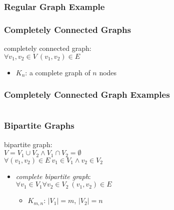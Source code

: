 \documentclass[dvipsnames]{beamer}
\begin{document}
\begin{frame}
  \frametitle{Regular Graph Example}

  \begin{example}
    \begin{center}
    \end{center}
  \end{example}
\end{frame}

\begin{frame}
  \frametitle{Completely Connected Graphs}

  \begin{definition}
    \alert{completely connected graph}:\\
    $\forall v_1,v_2 \in V~(v_1,v_2) \in E$

    \begin{itemize}
      \item $K_n$: a complete graph of $n$ nodes
    \end{itemize}
  \end{definition}
\end{frame}

\begin{frame}
  \frametitle{Completely Connected Graph Examples}

  \begin{columns}
    \begin{example}[$K_4$]
      \begin{center}
      \end{center}
    \end{example}

    \begin{example}[$K_5$]
      \begin{center}
      \end{center}
    \end{example}
  \end{columns}
\end{frame}

\begin{frame}
  \frametitle{Bipartite Graphs}

  \begin{definition}
    \alert{bipartite graph}:\\
    $V = V_1 \cup V_2 \wedge V_1 \cap V_2 = \emptyset$\\
    $\forall (v_1,v_2) \in E~v_1 \in V_1 \wedge v_2 \in V_2$

    \pause
    \begin{itemize}
      \item \emph{complete bipartite graph}:\\
      $\forall v_1 \in V_1 \forall v_2 \in V_2~(v_1,v_2) \in E$
      \begin{itemize}
        \item $K_{m,n}$: $|V_1|=m$, $|V_2|=n$
      \end{itemize}
    \end{itemize}
  \end{definition}
\end{frame}
\end{document}
